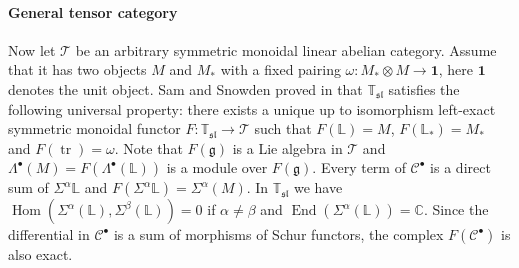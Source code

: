 \documentclass[12pt, reqno]{article}
\def\gen{\mathfrak{g}}
\def\Cc{\mathcal{C}}
\def\fsl{\mathfrak{sl}}
\def\End{\on{{End}}}
\def\Hom{\operatorname{Hom}\nolimits}
\def\on{\operatorname}
\def\tr{{\on{tr}}}
\theoremstyle{definition}
\theoremstyle{remark}
\numberwithin{itemcounter}{section}
\numberwithin{equation}{section}
\begin{document}
 \paragraph{General tensor category} Now let $\mathcal T$ be an arbitrary symmetric monoidal linear abelian category. Assume that it has two objects $M$ and $M_*$ with a fixed pairing $\omega:M_*\otimes M\to \mathbf{1}$, here $\mathbf 1$ denotes the unit object. Sam and Snowden proved in \cite{SS-stable} that $\mathbb T_{\fsl} $ satisfies the following universal property: there exists a unique up to isomorphism left-exact symmetric monoidal functor $F:\mathbb T_\fsl\to \mathcal T$ such that $F(\mathbb L)=M$, $F(\mathbb L_*)=M_*$ and $F(\tr)=\omega$. Note that $F(\gen)$ is a Lie algebra in $\mathcal T$ and $\Lambda^\bullet(M)=F(\Lambda^\bullet(\mathbb L))$ is a module over $F(\gen)$. 
Every term of $\Cc^\bullet$ is a direct sum of $\Sigma^{\alpha}\mathbb L$ and $F(\Sigma^{\alpha}\mathbb L)=\Sigma^\alpha(M)$. In $\mathbb T_{\fsl}$ we have $\Hom(\Sigma^\alpha(\mathbb L),\Sigma^\beta(\mathbb L))=0$ if $\alpha\neq\beta$ and $\End(\Sigma^\alpha(\mathbb L))=\mathbb C$. Since the differential in $\Cc^\bullet$ is a sum of morphisms of Schur functors, the complex $F(\Cc^\bullet)$ is also exact.

\fi
 
\end{document}
